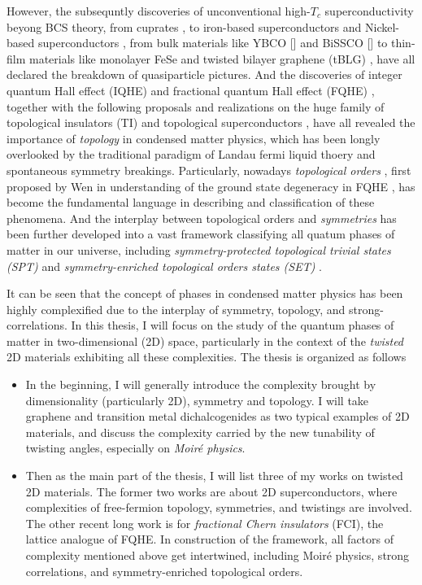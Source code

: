 However, the subsequntly discoveries of unconventional high-$T_c$ superconductivity beyong BCS theory, from cuprates \cite{bednorz1986possible}, to iron-based superconductors \cite{kamihara2006iron} and Nickel-based superconductors \cite{li2019superconductivity}, from bulk materials like YBCO [] and BiSSCO [] to thin-film materials like monolayer FeSe \cite{liu2012electronic} and twisted bilayer graphene (tBLG) \cite{cao2018correlated,cao2018unconventional}, have all declared the breakdown of quasiparticle pictures. And the discoveries of integer quantum Hall effect (IQHE) \cite{klitzing1980new} and fractional quantum Hall effect (FQHE) \cite{tsui1982two,willett1987observation}, together with the following proposals and realizations on the huge family of topological insulators (TI) \cite{bernevig2006quantum,hsieh2008topological} and topological superconductors \cite{xu2014artificial}, have all revealed the importance of \emph{topology} in condensed matter physics, which has been longly overlooked by the traditional paradigm of Landau fermi liquid thoery and spontaneous symmetry breakings. Particularly, nowadays \emph{topological orders} \cite{wen1990topological,levin2005string,chen2010local,wen2002quantum}, first proposed by Wen in understanding of the ground state degeneracy in FQHE \cite{wen1990ground}, has become the fundamental language in describing and classification of these phenomena. And the interplay between topological orders and \emph{symmetries} has been further developed into a vast framework classifying all quatum phases of matter in our universe, including \emph{symmetry-protected topological trivial states (SPT)} \cite{chen2013symmetry} and \emph{symmetry-enriched topological orders states (SET)} \cite{mesaros2013classification}.

It can be seen that the concept of phases in condensed matter physics has been highly complexified due to the interplay of symmetry, topology, and strong-correlations. In this thesis, I will focus on the study of the quantum phases of matter in two-dimensional (2D) space, particularly in the context of the \emph{twisted} 2D materials exhibiting all these complexities. The thesis is organized as follows
\begin{itemize}
    \item In the beginning, I will generally introduce the complexity brought by dimensionality (particularly 2D), symmetry and topology. I will take graphene and transition metal dichalcogenides as two typical examples of 2D materials, and discuss the complexity carried by the new tunability of twisting angles, especially on \emph{Moir\'{e} physics}.
    \item Then as the main part of the thesis, I will list three of my works on twisted 2D materials. The former two works are about 2D superconductors, where complexities of free-fermion topology, symmetries, and twistings are involved. The other recent long work is for \emph{fractional Chern insulators} (FCI), the lattice analogue of FQHE. In construction of the framework, all factors of complexity mentioned above get intertwined, including Moir\'{e} physics, strong correlations, and symmetry-enriched topological orders.
\end{itemize}

